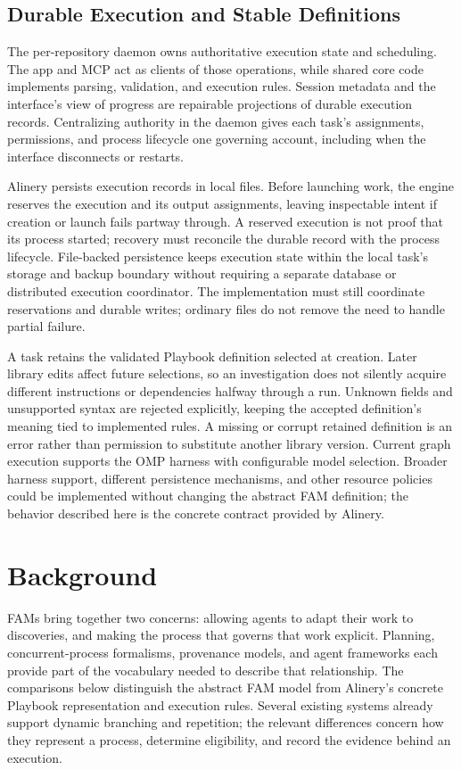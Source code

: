 \documentclass[letterpaper]{article}
\theoremstyle{definition}
\begin{document}
\subsection{Durable Execution and Stable Definitions}

The per-repository daemon owns authoritative execution state and scheduling.
The app and MCP act as clients of those operations, while shared core code
implements parsing, validation, and execution rules. Session metadata and
the interface's view of progress are repairable projections of durable
execution records. Centralizing authority in the daemon gives each task's
assignments, permissions, and process lifecycle one governing account,
including when the interface disconnects or restarts.

Alinery persists execution records in local files. Before launching work,
the engine reserves the execution and its output assignments, leaving
inspectable intent if creation or launch fails partway through. A reserved
execution is not proof that its process started; recovery must reconcile
the durable record with the process lifecycle. File-backed persistence
keeps execution state within the local task's storage and backup boundary
without requiring a separate database or distributed execution coordinator.
The implementation must still coordinate reservations and durable writes;
ordinary files do not remove the need to handle partial failure.

A task retains the validated Playbook definition selected at creation.
Later library edits affect future selections, so an investigation does not
silently acquire different instructions or dependencies halfway through a
run. Unknown fields and unsupported syntax are rejected explicitly, keeping
the accepted definition's meaning tied to implemented rules. A missing or
corrupt retained definition is an error rather than permission to substitute
another library version. Current graph execution supports the OMP harness
with configurable model selection. Broader harness support, different
persistence mechanisms, and other resource policies could be implemented
without changing the abstract FAM definition; the behavior described here
is the concrete contract provided by Alinery.

\section{Background}
\label{sec:background}

FAMs bring together two concerns: allowing agents to adapt their work to
discoveries, and making the process that governs that work explicit. Planning,
concurrent-process formalisms, provenance models, and agent frameworks each
provide part of the vocabulary needed to describe that relationship. The
comparisons below distinguish the abstract FAM model from Alinery's concrete
Playbook representation and execution rules. Several existing systems already
support dynamic branching and repetition; the relevant differences concern
how they represent a process, determine eligibility, and record the evidence
behind an execution.
\end{document}

